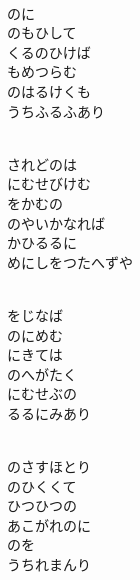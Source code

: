 \documentclass[10pt,b5j]{tarticle} %
\begin{document}
\begin{enumerate}
\begin{minipage}[c]{\blocksize}
        \vspace{\linespace}
        \item~\\
        のに\\
        のもひして\\
        くるのひけば\\
        もめつらむ\\
        のはるけくも\\
        うちふるふあり
        
        \vspace{\linespace}
        \item~\\
        されどのは\\
        にむせびけむ\\
        をかむの\\
        のやいかなれば\\
        かひるるに\\
        めにしをつたへずや
        
        \vspace{\linespace}
        \item~\\
        をじなば\\
        のにめむ\\
        にきては\\
        のへがたく\\
        にむせぶの\\
        るるにみあり
        
        \vspace{\linespace}
        \item~\\
        のさすほとり\\
        のひくくて\\
        ひつひつの\\
        あこがれのに\\
        のを\\
        うちれまんり
    
    \end{minipage}
\end{enumerate} %
\end{document}
